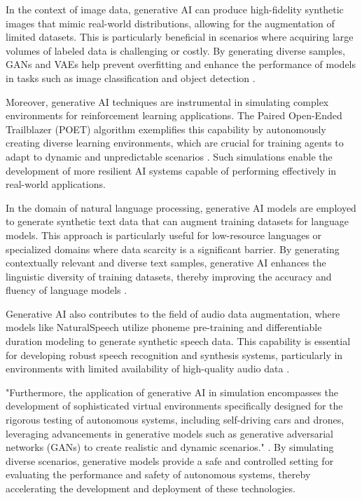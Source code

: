 In the context of image data, generative AI can produce high-fidelity synthetic images that mimic real-world distributions, allowing for the augmentation of limited datasets. This is particularly beneficial in scenarios where acquiring large volumes of labeled data is challenging or costly. By generating diverse samples, GANs and VAEs help prevent overfitting and enhance the performance of models in tasks such as image classification and object detection \cite{dhariwal2021diffusion}. 



Moreover, generative AI techniques are instrumental in simulating complex environments for reinforcement learning applications. The Paired Open-Ended Trailblazer (POET) algorithm exemplifies this capability by autonomously creating diverse learning environments, which are crucial for training agents to adapt to dynamic and unpredictable scenarios \cite{wang2019pairedopenendedtrailblazerpoet}. Such simulations enable the development of more resilient AI systems capable of performing effectively in real-world applications.



In the domain of natural language processing, generative AI models are employed to generate synthetic text data that can augment training datasets for language models. This approach is particularly useful for low-resource languages or specialized domains where data scarcity is a significant barrier. By generating contextually relevant and diverse text samples, generative AI enhances the linguistic diversity of training datasets, thereby improving the accuracy and fluency of language models \cite{tang2023mvpmultitasksupervisedpretraining}.



Generative AI also contributes to the field of audio data augmentation, where models like NaturalSpeech utilize phoneme pre-training and differentiable duration modeling to generate synthetic speech data. This capability is essential for developing robust speech recognition and synthesis systems, particularly in environments with limited availability of high-quality audio data \cite{tan2022naturalspeechendtoendtextspeech}.



"Furthermore, the application of generative AI in simulation encompasses the development of sophisticated virtual environments specifically designed for the rigorous testing of autonomous systems, including self-driving cars and drones, leveraging advancements in generative models such as generative adversarial networks (GANs) to create realistic and dynamic scenarios." \cite{park2023domainadaptationbasedhuman,jucys2024interpretabilityactionexploratoryanalysis,palmini2024patternscreativityuserinput,bassner2024irisaidrivenvirtualtutor}. By simulating diverse scenarios, generative models provide a safe and controlled setting for evaluating the performance and safety of autonomous systems, thereby accelerating the development and deployment of these technologies.


